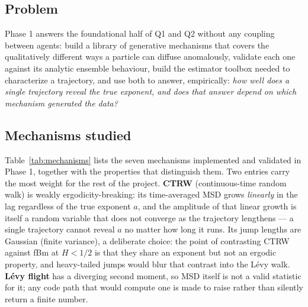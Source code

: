 \documentclass[11pt]{article}
\begin{document}
\subsection{Problem}

Phase 1 answers the foundational half of Q1 and Q2 without any coupling
between agents: build a library of generative mechanisms that covers the
qualitatively different ways a particle can diffuse anomalously, validate each
one against its analytic ensemble behaviour, build the estimator toolbox
needed to characterize a trajectory, and use both to answer, empirically:
\emph{how well does a single trajectory reveal the true exponent, and does
that answer depend on which mechanism generated the data?}

\subsection{Mechanisms studied}

Table~\ref{tab:mechanisms} lists the seven mechanisms implemented and
validated in Phase 1, together with the properties that distinguish them.
Two entries carry the most weight for the rest of the project. \textbf{CTRW}
(continuous-time random walk) is weakly ergodicity-breaking: its
time-averaged MSD grows \emph{linearly} in the lag regardless of the true
exponent $a$, and the amplitude of that linear growth is itself a random
variable that does not converge as the trajectory lengthens --- a single
trajectory cannot reveal $a$ no matter how long it runs. Its jump lengths are
Gaussian (finite variance), a deliberate choice: the point of contrasting CTRW
against fBm at $H<1/2$ is that they share an exponent but not an ergodic
property, and heavy-tailed jumps would blur that contrast into the L\'evy
walk. \textbf{L\'evy flight} has a diverging second moment, so MSD itself is
not a valid statistic for it; any code path that would compute one is made to
raise rather than silently return a finite number.
\end{document}
